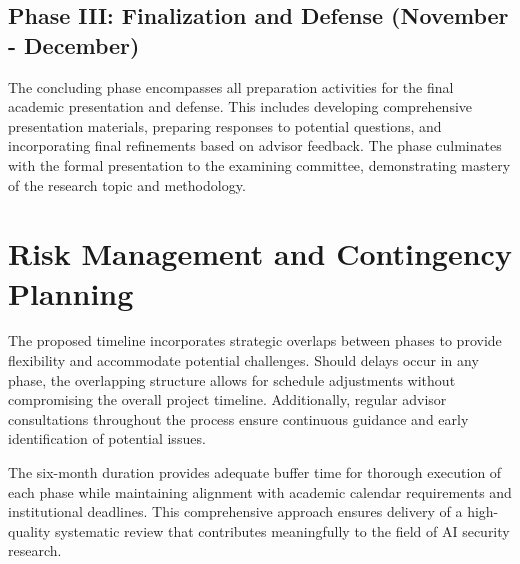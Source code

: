 \documentclass[twoside,brazilian,english]{UNISINOSmonografia}
\begin{document}
\subsection{Phase III: Finalization and Defense (November - December)}
The concluding phase encompasses all preparation activities for the final academic presentation and defense. This includes developing comprehensive presentation materials, preparing responses to potential questions, and incorporating final refinements based on advisor feedback. The phase culminates with the formal presentation to the examining committee, demonstrating mastery of the research topic and methodology.

\section{Risk Management and Contingency Planning}

The proposed timeline incorporates strategic overlaps between phases to provide flexibility and accommodate potential challenges. Should delays occur in any phase, the overlapping structure allows for schedule adjustments without compromising the overall project timeline. Additionally, regular advisor consultations throughout the process ensure continuous guidance and early identification of potential issues.

The six-month duration provides adequate buffer time for thorough execution of each phase while maintaining alignment with academic calendar requirements and institutional deadlines. This comprehensive approach ensures delivery of a high-quality systematic review that contributes meaningfully to the field of AI security research.




\end{document}
